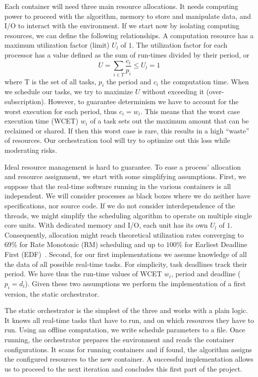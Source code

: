 \documentclass[]{scrartcl}
\begin{document}
Each container will need three main resource allocations.
It needs computing power to proceed with the algorithm, memory to store and manipulate data, and I/O to interact with the environment.
If we start now by isolating computing resources, we can define the following relationships.
A computation resource has a maximum utilization factor (limit) $U_l$ of $1$.
The utilization factor for each processor has a value defined as the sum of run-times divided by their period, or
\begin{equation}
	U = \sum_{i \in T}^{}{\frac{c_i}{p_i}} \leq U_l = 1
\end{equation}  
where T is the set of all tasks, $p_i$ the period and $c_i$ the computation time.
When we schedule our tasks, we try to maximize $U$ without exceeding it (over-subscription).
However, to guarantee determinism we have to account for the worst execution for each period, thus $c_i = w_i$.
This means that the worst case execution time (WCET) $w_i$ of a task sets out the maximum amount that can be reclaimed or shared.
If then this worst case is rare, this results in a high ``waste'' of resources.
Our orchestration tool will try to optimize out this loss while moderating risks.

Ideal resource management is hard to guarantee.
To ease a process' allocation and resource assignment, we start with some simplifying assumptions.
First, we suppose that the real-time software running in the various containers is all independent.
We will consider processes as black boxes where we do neither have specifications, nor source code.
If we do not consider interdependence of the threads, we might simplify the scheduling algorithm to operate on multiple single core units. 
With dedicated memory and I/O, each unit has its own $U_l$ of $1$.
Consequently, allocation might reach theoretical utilization rates converging to $69\%$ for Rate Monotonic (RM) scheduling and up to $100\%$ for Earliest Deadline First (EDF)~\cite{Buttazzo2011}. 
Second, for our first implementations we assume knowledge of all the data of all possible real-time tasks.
For simplicity, task deadlines track their period.
We have thus the run-time values of WCET $w_i$, period and deadline ($p_i = d_i$).
Given these two assumptions we perform the implementation of a first version, the static orchestrator.

The static orchestrator is the simplest of the three and works with a plain logic. 
It knows all real-time tasks that have to run, and on which resources they have to run. 
Using an offline computation, we write schedule parameters to a file. 
Once running, the orchestrator prepares the environment and reads the container configurations.
It scans for running containers and if found, the algorithm assigns the configured resources to the new container.
A successful implementation allows us to proceed to the next iteration and concludes this first part of the project.
\end{document}
